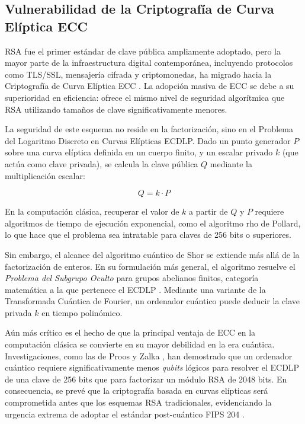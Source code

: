 \documentclass[11pt, a4paper]{report}
\theoremstyle{definition}
\begin{document}
\subsection{Vulnerabilidad de la Criptografía de Curva Elíptica ECC}

RSA fue el primer estándar de clave pública ampliamente adoptado, pero la mayor parte de la infraestructura digital contemporánea, incluyendo protocolos como TLS/SSL, mensajería cifrada y criptomonedas, ha migrado hacia la Criptografía de Curva Elíptica ECC \cite{miller1985}. La adopción masiva de ECC se debe a su superioridad en eficiencia: ofrece el mismo nivel de seguridad algorítmica que RSA utilizando tamaños de clave significativamente menores.

La seguridad de este esquema no reside en la factorización, sino en el Problema del Logaritmo Discreto en Curvas Elípticas ECDLP. Dado un punto generador $P$ sobre una curva elíptica definida en un cuerpo finito, y un escalar privado $k$ (que actúa como clave privada), se calcula la clave pública $Q$ mediante la multiplicación escalar:

$$ Q = k \cdot P $$

En la computación clásica, recuperar el valor de $k$ a partir de $Q$ y $P$ requiere algoritmos de tiempo de ejecución exponencial, como el algoritmo rho de Pollard, lo que hace que el problema sea intratable para claves de 256 bits o superiores.

Sin embargo, el alcance del algoritmo cuántico de Shor se extiende más allá de la factorización de enteros. En su formulación más general, el algoritmo resuelve el \textit{Problema del Subgrupo Oculto} para grupos abelianos finitos, categoría matemática a la que pertenece el ECDLP \cite{shor1994}. Mediante una variante de la Transformada Cuántica de Fourier, un ordenador cuántico puede deducir la clave privada $k$ en tiempo polinómico.

Aún más crítico es el hecho de que la principal ventaja de ECC en la computación clásica se convierte en su mayor debilidad en la era cuántica. Investigaciones, como las de Proos y Zalka \cite{proos2003}, han demostrado que un ordenador cuántico requiere significativamente menos \textit{qubits} lógicos para resolver el ECDLP de una clave de 256 bits que para factorizar un módulo RSA de 2048 bits. En consecuencia, se prevé que la criptografía basada en curvas elípticas será comprometida antes que los esquemas RSA tradicionales, evidenciando la urgencia extrema de adoptar el estándar post-cuántico FIPS 204 \cite{nist_fips204}.
\end{document}
